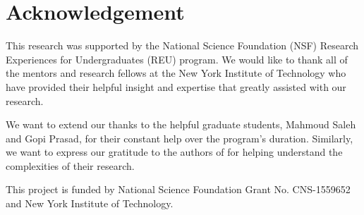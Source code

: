 \documentclass[conference]{IEEEtran}
\begin{document}
\section{Acknowledgement}\label{section:acnkowledgement}

This research was supported by the National Science Foundation (NSF) Research Experiences for Undergraduates (REU) program. We would like to thank all of the mentors and research fellows at the New York Institute of Technology who have provided their helpful insight and expertise that greatly assisted with our research.

We want to extend our thanks to the helpful graduate students, Mahmoud Saleh and Gopi Prasad, for their constant help over the program's duration. Similarly, we want to express our gratitude to the authors of \cite{zhang2016litell} for helping understand the complexities of their research.

This project is funded by National Science Foundation Grant No. CNS-1559652 and New York Institute of Technology.

 

\end{document}
